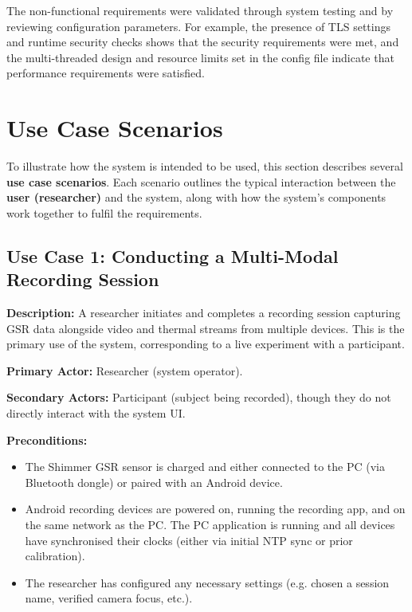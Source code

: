The non-functional requirements were validated through system testing and by reviewing configuration parameters. For example, the presence of TLS settings and runtime security checks shows that the security requirements were met, and the multi-threaded design and resource limits set in the config file indicate that performance requirements were satisfied.


\section{Use Case Scenarios}
To illustrate how the system is intended to be used, this section describes several \textbf{use case scenarios}. Each scenario outlines the typical interaction between the \textbf{user (researcher)} and the system, along with how the system's components work together to fulfil the requirements.

\subsection{Use Case 1: Conducting a Multi-Modal Recording Session}
\textbf{Description:} A researcher initiates and completes a recording session capturing GSR data alongside video and thermal streams from multiple devices. This is the primary use of the system, corresponding to a live experiment with a participant.

\textbf{Primary Actor:} Researcher (system operator).

\textbf{Secondary Actors:} Participant (subject being recorded), though they do not directly interact with the system UI.

\textbf{Preconditions:}
\begin{itemize}
    \item The Shimmer GSR sensor is charged and either connected to the PC (via Bluetooth dongle) or paired with an Android device.
    \item Android recording devices are powered on, running the recording app, and on the same network as the PC. The PC application is running and all devices have synchronised their clocks (either via initial NTP sync or prior calibration).
    \item The researcher has configured any necessary settings (e.g. chosen a session name, verified camera focus, etc.).
\end{itemize}

